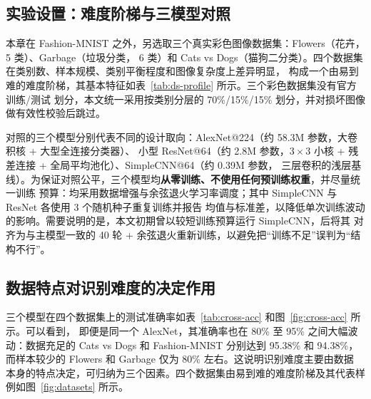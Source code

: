 \documentclass[12pt,a4paper,fontset=fandol]{ctexart}
\numberwithin{figure}{section}
\numberwithin{table}{section}
\numberwithin{equation}{section}
\begin{document}
\subsection{实验设置：难度阶梯与三模型对照}
本章在 Fashion-MNIST 之外，另选取三个真实彩色图像数据集：Flowers（花卉，5 类）、Garbage（垃圾分类，
6 类）和 Cats vs Dogs（猫狗二分类）。四个数据集在类别数、样本规模、类别平衡程度和图像复杂度上差异明显，
构成一个由易到难的难度阶梯，其基本特征如表~\ref{tab:ds-profile} 所示。三个彩色数据集没有官方训练/测试
划分，本文统一采用按类别分层的 70\%/15\%/15\% 划分，并对损坏图像做有效性校验后跳过。

\begin{table}[H]
  \centering
  \caption{四个数据集的基本特征}
  \label{tab:ds-profile}
\end{table}

对照的三个模型分别代表不同的设计取向：AlexNet@224（约 58.3M 参数，大卷积核 + 大型全连接分类器）、
小型 ResNet@64（约 2.8M 参数，$3\times3$ 小核 + 残差连接 + 全局平均池化）、SimpleCNN@64（约 0.39M 参数，
三层卷积的浅层基线）。为保证对照公平，三个模型均\textbf{从零训练、不使用任何预训练权重}，并尽量统一训练
预算：均采用数据增强与余弦退火学习率调度；其中 SimpleCNN 与 ResNet 各使用 3 个随机种子重复训练并报告
均值与标准差，以降低单次训练波动的影响。需要说明的是，本文初期曾以较短训练预算运行 SimpleCNN，后将其
对齐为与主模型一致的 40 轮 + 余弦退火重新训练，以避免把“训练不足”误判为“结构不行”。

\subsection{数据特点对识别难度的决定作用}
三个模型在四个数据集上的测试准确率如表~\ref{tab:cross-acc} 和图~\ref{fig:cross-acc} 所示。可以看到，
即便是同一个 AlexNet，其准确率也在 80\% 至 95\% 之间大幅波动：数据充足的 Cats vs Dogs 和 Fashion-MNIST
分别达到 95.38\% 和 94.38\%，而样本较少的 Flowers 和 Garbage 仅为 80\% 左右。这说明识别难度主要由数据
本身的特点决定，可归纳为三个因素。四个数据集由易到难的难度阶梯及其代表样例如图~\ref{fig:datasets} 所示。
\end{document}
